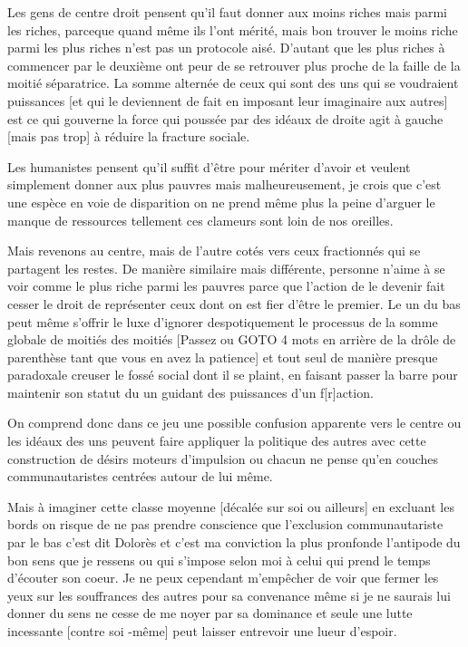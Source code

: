 \documentclass{article}
\begin{document}
Les gens de centre droit pensent qu'il faut donner aux moins riches mais parmi les riches, parceque quand même ils l'ont mérité, mais bon trouver le moins riche parmi les plus riches n'est pas un protocole aisé.
D'autant que les plus riches à commencer par le deuxième ont peur de se retrouver plus proche de la faille de la moitié séparatrice. La somme alternée de ceux qui sont des uns qui se voudraient puissances [et qui le deviennent de fait en imposant leur imaginaire aux autres] est  ce qui gouverne la force  qui poussée par des idéaux de droite agit à gauche [mais pas trop] à réduire la fracture sociale.

Les humanistes pensent qu'il suffit d'être pour mériter d'avoir et veulent simplement donner aux plus pauvres mais malheureusement, je crois que  c'est  une espèce en voie de disparition on ne prend même plus la peine d'arguer le manque de ressources tellement ces clameurs sont loin de nos oreilles. 

Mais revenons au centre, mais de l'autre cotés vers ceux fractionnés qui se partagent les restes. De manière similaire mais différente, 
personne n'aime à se voir comme le plus riche parmi les pauvres parce que l'action de le devenir fait cesser le droit de représenter ceux dont on est fier d'être le premier. Le un du bas peut même s'offrir le luxe d'ignorer despotiquement le processus de la somme  globale de moitiés des moitiés [Passez  ou  GOTO 4 mots en arrière de la drôle de parenthèse tant que vous en avez la patience] et tout seul de manière presque paradoxale creuser le fossé social dont il se plaint, en faisant passer la barre pour maintenir son statut du un guidant  des puissances d'un f[r]action. 

On comprend donc dans ce jeu une possible confusion apparente vers le centre ou les idéaux des uns peuvent faire appliquer la politique des autres avec cette construction de désirs moteurs d'impulsion ou chacun ne pense qu'en couches communautaristes centrées autour de lui même.

Mais  à imaginer cette classe moyenne [décalée sur soi ou ailleurs] en  excluant les bords  on risque de ne pas prendre conscience que l'exclusion communautariste par le bas c'est dit Dolorès  et c'est ma conviction la plus pronfonde l'antipode du bon sens que je ressens ou qui s'impose selon moi à celui qui prend le temps d'écouter son coeur.  Je ne peux cependant m'empêcher de voir   que fermer les yeux sur les souffrances des autres pour sa convenance même si je ne saurais lui donner  du sens ne cesse de me noyer   par sa dominance et seule une lutte incessante [contre soi -même] peut laisser entrevoir une lueur d'espoir.
\end{document}
